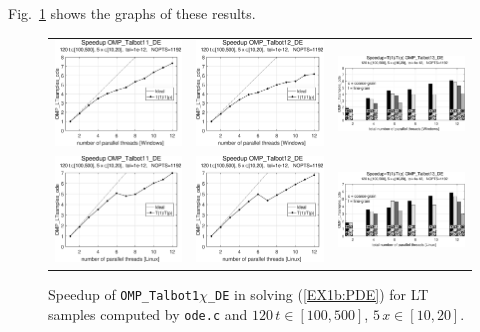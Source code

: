 \documentclass[a4paper,10pt]{report}%
\begin{document}
Fig.~\ref{PAR_EX1b_speedup_ode} shows the graphs of these results.
\begin{figure}[htb]
\centering
\begin{tabular}{ccc} %
\includegraphics[height=0.2\textwidth]{./FIGS/EX1b/EX1b_ode_speedup_11_Windows.eps} &
\includegraphics[height=0.2\textwidth]{./FIGS/EX1b/EX1b_ode_speedup_12_Windows.eps} &
\includegraphics[height=0.2\textwidth,keepaspectratio=true]{./FIGS/EX1b/EX1b_ode_speedup_13_Windows.eps} \\
\includegraphics[height=0.2\textwidth]{./FIGS/EX1b/EX1b_ode_speedup_11_Linux.eps} &
\includegraphics[height=0.2\textwidth]{./FIGS/EX1b/EX1b_ode_speedup_12_Linux.eps} &
\includegraphics[height=0.2\textwidth,keepaspectratio=true]{./FIGS/EX1b/EX1b_ode_speedup_13_Linux.eps}
\end{tabular}
\caption{\small Speedup of {\tt OMP\_Talbot1$\chi$\_DE} in solving (\ref{EX1b:PDE}) for LT samples
computed by {\tt ode.c} and $120\,t\in[100,500]$, $5\,x\in[10,20]$.}
\label{PAR_EX1b_speedup_ode}
\end{figure}
\end{document}
